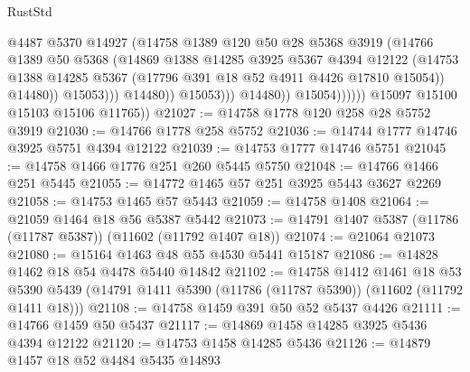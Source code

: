 \begin{lexlean}{RustStd}
\begin{coremodule}
                                      @4487
                                      @5370
                                      @14927
                                      (@14758
                                        @1389
                                        @120
                                        @50
                                        @28
                                        @5368
                                        @3919
                                        (@14766
                                          @1389
                                          @50
                                          @5368
                                          (@14869
                                            @1388
                                            @14285
                                            @3925
                                            @5367
                                            @4394
                                            @12122
                                            (@14753
                                              @1388
                                              @14285
                                              @5367
                                              (@17796 @391 @18 @52 @4911 @4426 @17810 @15054))
                                            @14480))
                                        @15053)))
                                  @14480))
                              @15053)))
                        @14480))
                    @15054))))))
        @15097
        @15100
        @15103
        @15106
        @11765))
@21027 := @14758 @1778 @120 @258 @28 @5752 @3919
@21030 := @14766 @1778 @258 @5752
@21036 := @14744 @1777 @14746 @3925 @5751 @4394 @12122
@21039 := @14753 @1777 @14746 @5751
@21045 := @14758 @1466 @1776 @251 @260 @5445 @5750
@21048 := @14766 @1466 @251 @5445
@21055 := @14772 @1465 @57 @251 @3925 @5443 @3627 @2269
@21058 := @14753 @1465 @57 @5443
@21059 := @14758 @1408
@21064 := @21059 @1464 @18 @56 @5387 @5442
@21073 := @14791 @1407 @5387 (@11786 (@11787 @5387)) (@11602 (@11792 @1407 @18))
@21074 := @21064 @21073
@21080 := @15164 @1463 @48 @55 @4530 @5441 @15187
@21086 := @14828 @1462 @18 @54 @4478 @5440 @14842
@21102 := @14758
    @1412
    @1461
    @18
    @53
    @5390
    @5439
    (@14791 @1411 @5390 (@11786 (@11787 @5390)) (@11602 (@11792 @1411 @18)))
@21108 := @14758 @1459 @391 @50 @52 @5437 @4426
@21111 := @14766 @1459 @50 @5437
@21117 := @14869 @1458 @14285 @3925 @5436 @4394 @12122
@21120 := @14753 @1458 @14285 @5436
@21126 := @14879 @1457 @18 @52 @4484 @5435 @14893

\end{coremodule}
\end{lexlean}
